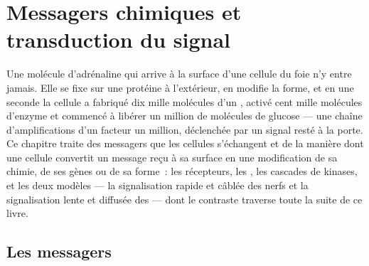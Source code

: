 \chapter{Messagers chimiques et transduction du signal}\label{ch:b2:cell-signalling}

Une molécule d'adrénaline qui arrive à la surface d'une cellule du foie
n'y entre jamais. Elle se fixe sur une protéine à l'extérieur, en modifie
la forme, et en une seconde la cellule a fabriqué dix mille molécules
d'un , activé cent mille molécules d'enzyme et commencé à
libérer un million de molécules de glucose --- une chaîne
d'amplifications d'un facteur un million, déclenchée par un signal resté
à la porte. Ce chapitre traite des messagers que les cellules
s'échangent et de la manière dont une cellule convertit un message reçu
à sa surface en une modification de sa chimie, de ses gènes ou de sa
forme~: les récepteurs, les , les cascades de kinases,
et les deux modèles --- la signalisation rapide et câblée des nerfs et la
signalisation lente et diffusée des  --- dont le contraste
traverse toute la suite de ce livre.

\section{Les messagers}

